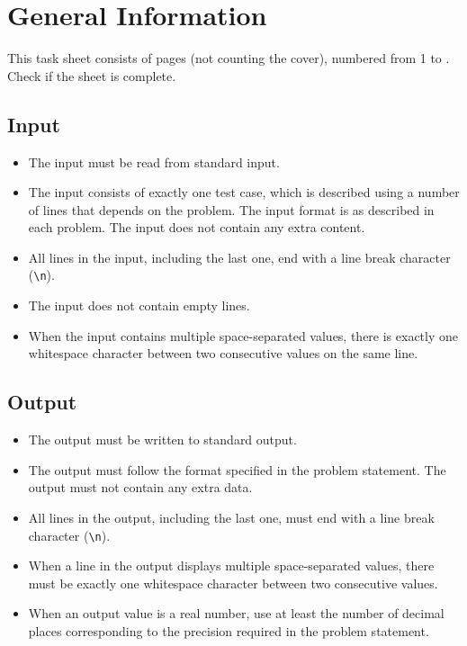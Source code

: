 \section*{General Information}

This task sheet consists of \pageref*{lastpage} pages (not counting the cover), numbered from 1 to \pageref*{lastpage}. Check if the sheet is complete.

\subsection*{Input}

\begin{itemize}
\item The input must be read from standard input.

	\item The input consists of exactly one test case, which is described using a number of lines that depends on the problem. The input format is as described in each problem. The input does not contain any extra content.

	\item All lines in the input, including the last one, end with a line break character (\texttt{\textbackslash n}).

	\item The input does not contain empty lines.

	\item When the input contains multiple space-separated values, there is exactly one whitespace character between two consecutive values on the same line.
\end{itemize}

\subsection*{Output}

\begin{itemize}
	\item The output must be written to standard output.

	\item The output must follow the format specified in the problem statement. The output must not contain any extra data.

	\item All lines in the output, including the last one, must end with a line break character (\texttt{\textbackslash n}).

	\item When a line in the output displays multiple space-separated values, there must be exactly one whitespace character between two consecutive values.

	\item When an output value is a real number, use at least the number of decimal places corresponding to the precision required in the problem statement.
\end{itemize}


